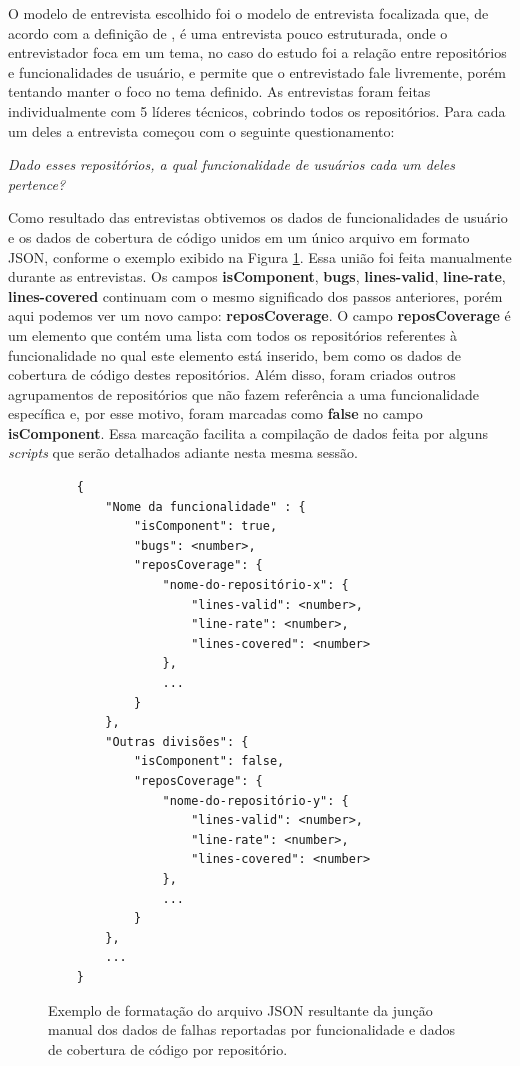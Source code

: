 \documentclass[11.5pt]{article}
\begin{document}
O modelo de entrevista escolhido foi o modelo de entrevista focalizada que, de acordo com a
definição de \cite{metodosPesquisaSocial}, é uma entrevista pouco estruturada, onde o entrevistador
foca em um tema, no caso do estudo foi a relação entre repositórios e funcionalidades de usuário,
e permite que o entrevistado fale livremente, porém tentando manter o foco no tema definido.
As entrevistas foram feitas individualmente com 5 líderes técnicos, cobrindo todos os repositórios.
Para cada um deles a entrevista começou com o seguinte questionamento:

\begin{center}
\textit{Dado esses repositórios, a qual funcionalidade de usuários cada um deles pertence?}
\end{center}

Como resultado das entrevistas obtivemos os dados de funcionalidades de usuário e os dados de
cobertura de código unidos em um único arquivo em formato JSON, conforme o exemplo exibido na
Figura \ref{fig:formatoJsonFinal}.
Essa união foi feita manualmente durante as entrevistas.
Os campos \textbf{isComponent}, \textbf{bugs}, \textbf{lines-valid}, \textbf{line-rate},
\textbf{lines-covered} continuam com o mesmo significado dos passos anteriores, porém aqui podemos
ver um novo campo: \textbf{reposCoverage}.
O campo \textbf{reposCoverage} é um elemento que contém uma lista com todos os repositórios
referentes à funcionalidade no qual este elemento está inserido, bem como os dados de cobertura de
código destes repositórios.
Além disso, foram criados outros agrupamentos de repositórios que não fazem referência a uma
funcionalidade específica e, por esse motivo, foram marcadas como \textbf{false} no campo
\textbf{isComponent}.
Essa marcação facilita a compilação de dados feita por alguns \textit{scripts} que serão detalhados
adiante nesta mesma sessão.

\begin{figure}[ht]
\label{fig:formatoJsonFinal}
\small
\begin{verbatim}
    {
        "Nome da funcionalidade" : {
            "isComponent": true,
            "bugs": <number>,
            "reposCoverage": {
                "nome-do-repositório-x": {
                    "lines-valid": <number>,
                    "line-rate": <number>,
                    "lines-covered": <number>
                },
                ...
            }
        },
        "Outras divisões": {
            "isComponent": false,
            "reposCoverage": {
                "nome-do-repositório-y": {
                    "lines-valid": <number>,
                    "line-rate": <number>,
                    "lines-covered": <number>
                },
                ...
            }
        },
        ...
    }
\end{verbatim}
\caption{Exemplo de formatação do arquivo JSON resultante da junção manual dos dados de falhas
reportadas por funcionalidade e dados de cobertura de código por repositório.}
\end{figure}
\end{document}
